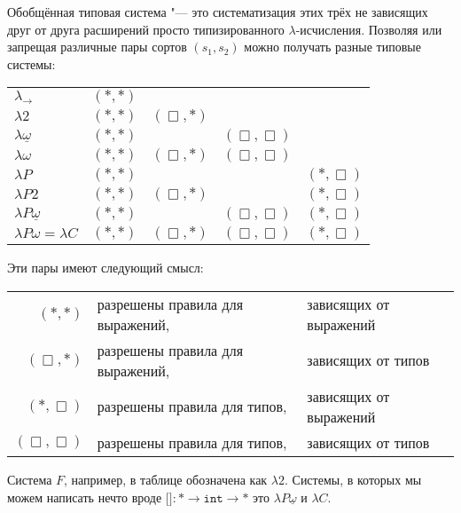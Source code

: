 Обобщённая типовая система "--- это систематизация этих трёх не зависящих друг от друга расширений
просто типизированного $\lambda$-исчисления.
Позволяя или запрещая различные пары сортов $(s_1, s_2)$ можно получать разные типовые системы:
\begin{center}
\begin{tabular}{l c c c c} \toprule
    $\lambda_\rightarrow$          & $(*, *)$ &             &                &             \\
    $\lambda 2$                    & $(*, *)$ & $(\Box, *)$ &                &             \\
    $\lambda \underline \omega$    & $(*, *)$ &             & $(\Box, \Box)$ &             \\
    $\lambda \omega$               & $(*, *)$ & $(\Box, *)$ & $(\Box, \Box)$ &             \\
    $\lambda P$                    & $(*, *)$ &             &                & $(*, \Box)$ \\
    $\lambda P2$                   & $(*, *)$ & $(\Box, *)$ &                & $(*, \Box)$ \\
    $\lambda P\underline \omega$   & $(*, *)$ &             & $(\Box, \Box)$ & $(*, \Box)$ \\
    $\lambda P \omega = \lambda C$ & $(*, *)$ & $(\Box, *)$ & $(\Box, \Box)$ & $(*, \Box)$ \\ \bottomrule
\end{tabular}
\end{center}%
Эти пары имеют следующий смысл:
\begin{center}
\begin{tabular}{r l@{\ }l} \toprule
    $(*, *)$       & разрешены правила для выражений, &зависящих от выражений \\
    $(\Box, *)$    & разрешены правила для выражений, &зависящих от типов     \\
    $(*, \Box)$    & разрешены правила для типов,     &зависящих от выражений \\
    $(\Box, \Box)$ & разрешены правила для типов,     &зависящих от типов     \\ \bottomrule
\end{tabular}
\end{center}

Система $F$, например, в таблице обозначена как $\lambda 2$.
Системы, в которых мы можем написать нечто вроде
$\texttt{[]}: * \rightarrow \mathtt{int} \rightarrow *$ это $\lambda P \underline \omega$ и $\lambda C$.

